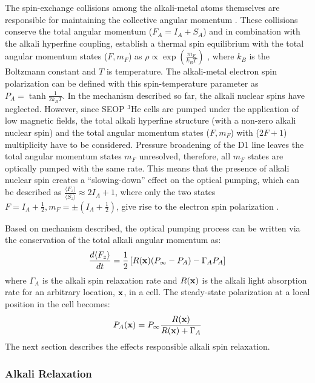 The spin-exchange collisions among the alkali-metal atoms themselves are responsible for maintaining the collective angular momentum \cite{Happer1972, Appelt1998}. These collisions conserve the total angular momentum ($F_{A}=I_{A}+S_{A}$) and in combination with the alkali hyperfine coupling, establish a thermal spin equilibrium with the total angular momentum states ($F, m_{F}$) as $\rho \propto \exp \left({\frac{ m_{F}}{k_BT}} \right) $ \cite{Happer1972, Appelt1998}, where $k_B$ is the Boltzmann constant and $T$ is temperature. The alkali-metal electron spin polarization can be defined with this spin-temperature parameter as $P_A = \tanh{\frac{1}{2k_BT}}$. In the mechanism described so far, the alkali nuclear spins have neglected. However, since SEOP $^3$He cells are pumped under the application of low magnetic fields, the total alkali hyperfine structure (with a non-zero alkali nuclear spin) and the total angular momentum states ($F, m_{F}$) with ($2F+1$) multiplicity have to be considered. Pressure broadening of the D1 line leaves the total angular momentum states $m_{F}$ unresolved, therefore, all $m_{F}$ states are optically pumped with the same rate. This means that the presence of alkali nuclear spin creates a “slowing-down” effect on the optical pumping, which can be described as $\frac{\langle F_z \rangle}{\langle S_z \rangle} \approx 2I_A + 1$, where only the two states $F=I_A+\frac{1}{2}, m_F = \pm(I_A+\frac{1}{2})$, give rise to the electron spin polarization \cite{Appelt1998}. 

Based on mechanism described, the optical pumping process can be written via the conservation of the total alkali angular momentum \cite{Gentile2017} as:
\begin{equation}
    \frac{d\langle F_z \rangle}{dt} = \frac{1}{2} \left[ R({\bf x}) (P_{\infty} -P_{A}) - \Gamma_A P_{A}    \right]
\end{equation}
where $\Gamma_A$ is the alkali spin relaxation rate and $R({\bf x})$ is the alkali light absorption rate for an arbitrary location, $\bf x$, in a cell. The steady-state polarization at a local position in the cell becomes:
\begin{equation}
    P_{A}({\bf x}) = P_{\infty} \frac{R({\bf x})}{R({\bf x}) + \Gamma_A}
\end{equation}
The next section describes the effects responsible alkali spin relaxation.

\subsubsection{Alkali Relaxation}

